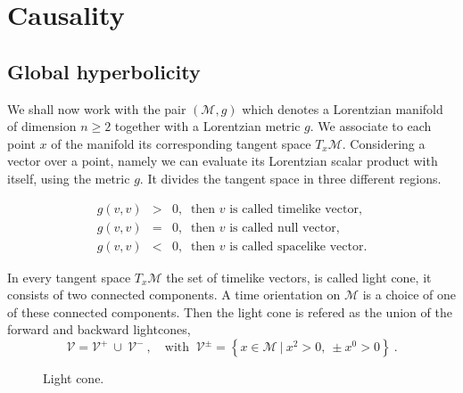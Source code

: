 \documentclass[11pt]{book}
\newcommand{\Mcal}{\mathcal{M}}
\newcommand{\Vcal}{\mathcal{V}}
\theoremstyle{break}
\begin{document}
\section{Causality}
\label{p:CAUSALITY}


\subsection{Global hyperbolicity}
\label{p:GLOB_HYPERBOL}


We shall now work with the pair $(\Mcal,g)$ which denotes a Lorentzian manifold of dimension $n \geq 2$ together with a Lorentzian metric $g$. We associate to each point $x$ of the manifold its corresponding tangent space $T_x\Mcal$. Considering a vector over a point, namely we can evaluate its Lorentzian scalar product with itself, using the metric $g$. It divides the tangent space in three different regions.


\begin{eqnarray*}
g(v,v) &>& 0 , \ \mbox{ then $v$ is called timelike vector}, \\ 
g(v,v) &=& 0 , \ \mbox{ then $v$ is called null vector}, \\ 
g(v,v) &<& 0 , \ \mbox{ then $v$ is called spacelike vector}.
\end{eqnarray*}


In every tangent space $T_x\Mcal$ the set of timelike vectors, is called light cone, it consists of two connected components. A time orientation on $\Mcal$ is a choice of one of these connected components. Then the light cone is refered as the union of the forward and backward lightcones, 
%
\begin{equation*}
\Vcal=\Vcal^{+} \ \cup \ \Vcal^{-} \ , \quad \mbox{with } \ \Vcal^{\pm}=\left\{ x\in\Mcal \ | \ x^{2}>0, \ \pm x^{0}>0 \right\} \ . 
\end{equation*}


\begin{figure}[ht!]
%
\begin{center}
%
%
\end{center}
%
\caption{Light cone.}
%
\end{figure}
\end{document}
